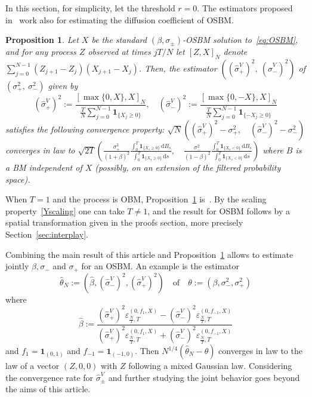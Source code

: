 \documentclass[12pt]{article}
\numberwithin{equation}{section}
\newtheorem{proposition}{Proposition}
\theoremstyle{definition}
\theoremstyle{remark}
\newcommand{\ind}[1]{\mathbf{1}_{#1}}
\newcommand{\vd}{\,\mathrm{d}}
\begin{document}
In this section, for simplicity, let the threshold $r=0$.
%
The estimators proposed in~\cite{lp} work also for estimating the diffusion coefficient of OSBM.
\begin{proposition} \label{lem:estim:sigma}
Let $X$ be the standard $(\beta,\sigma_\pm)$-OSBM solution to~\eqref{eq:OSBM}, and for any process $Z$ observed at times $j T/N$ let
$[Z,X]_N$ denote $\sum_{j=0}^{N-1} (Z_{j+1}-Z_j)(X_{j+1}-X_j)$.
Then, the estimator $((\widehat \sigma_+^V)^2, \ (\widehat \sigma_-^V)^2)$  of $(\sigma_+^2, \ \sigma_-^2)$ given by
\[ (\widehat \sigma_+^V) ^2 := \frac{ [ \max\{0,X\}, X ]_N}{\frac{T}{N} \sum_{j=0}^{N-1} \ind{\{X_{j} \geq 0\}} } , 
\quad  (\widehat \sigma_-^V) ^2 := \frac{ [ \max\{0, -X\}, X ]_N}{\frac{T}{N} \sum_{j=0}^{N-1} \ind{\{- X_{j} \geq 0\}} } \]
satisfies the following convergence property:
$\sqrt N \left( (\widehat \sigma_+^V)^2 -   \sigma_+ ^2, \quad (\widehat \sigma_-^V)^2 -   \sigma_- ^2\right)$ converges in law to
$
	\sqrt{2 T} \left( \frac{\sigma_+^2}{(1+\beta)^2} \frac{\int_0^T \ind{\{ X_s \geq 0 \}} \vd B_s}{\int_0^T \ind{\{ X_s \geq 0 \}} \vd s}, 
	\quad  \frac{\sigma_-^2}{(1-\beta)^2} \frac{\int_0^T \ind{\{ X_s < 0 \}} \vd B_s}{\int_0^T \ind{\{ X_s < 0 \}} \vd s} \right) 
$ 
where $B$ is a BM independent of $X$ (possibly, on an extension of the filtered probability space).
\end{proposition}
When $T=1$ and the process is OBM,  Proposition~\ref{lem:estim:sigma} is~\cite[Theorem~3.5]{lp}. 
By the scaling property~\eqref{Yscaling} one can take $T\neq 1$, and the result for OSBM follows by a spatial transformation given in the proofs section, more precisely Section~\ref{sec:interplay}.


Combining the main result of this article and Proposition~\ref{lem:estim:sigma} allows to estimate jointly $\beta, \sigma_-$ and $\sigma_+$ for an OSBM.
An example is the estimator 
\begin{equation}
	\widehat \theta_N:=( \widehat \beta, (\widehat \sigma_-^V)^2,(\widehat \sigma_+^V)^2) \quad \text{of} \quad \theta:=(\beta, \sigma_-^2,\sigma_+^2)
\end{equation} 
where
\begin{equation}
\widehat \beta := \frac{ (\widehat \sigma_+^V)^2 \varepsilon_{\frac{N}{T},T}^{(0,f_{1},X)} - (\widehat \sigma_-^V)^2  \varepsilon_{\frac{N}{T},T}^{(0,f_{-1},X)}}{(\widehat \sigma_+^V)^2  \varepsilon_{\frac{N}{T},T}^{(0,f_{1},X)}+ (\widehat \sigma_-^V)^2  \varepsilon_{\frac{N}{T},T}^{(0,f_{-1},X)}}
\end{equation}
and $f_{1}=\ind{(0,1)}$ and $f_{-1}=\ind{(-1,0)}$.
Then $N^{1/4} ( \widehat \theta_N- \theta)$ converges in law to the law of a vector $(Z,0,0)$ with $Z$ following a mixed Gaussian law.
Considering the convergence rate for $\widehat \sigma_\pm^V$ and further studying the joint behavior goes beyond the aims of this article.
\end{document}
